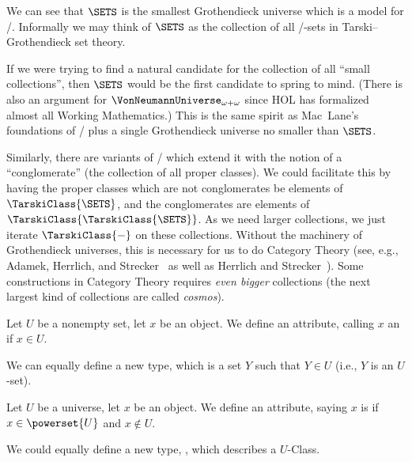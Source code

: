 \begin{remark}
We can see that $\SETS$ is the smallest Grothendieck universe which is a
model for \ZFC/. Informally we may think of $\SETS$ as the collection
of all \ZF/-sets in Tarski--Grothendieck set theory.

If we were trying to find a natural candidate for the collection of
all ``small collections'', then $\SETS$ would be the first candidate
to spring to mind. (There is also an argument for
$\VonNeumannUniverse_{\omega+\omega}$ since HOL has formalized almost
all Working Mathematics.) This is the same spirit as Mac~Lane's
foundations of \ZFpmC/ plus a single Grothendieck universe no smaller
than $\SETS$.

Similarly, there are variants of \MK/ which extend it with the notion
of a ``conglomerate'' (the collection of all proper classes). We could
facilitate this by having the proper classes which are not
conglomerates be elements of $\TarskiClass{\SETS}$, and the
conglomerates are elements of $\TarskiClass{\TarskiClass{\SETS}}$. As
we need larger collections, we just iterate $\TarskiClass{-}$ on these
collections. Without the machinery of Grothendieck universes, this is
necessary for us to do Category Theory (see, e.g., Adamek, Herrlich, and Strecker~\cite{adamek1990abstract}
as well as Herrlich and Strecker~\cite{horst2007category}). Some
constructions in Category Theory requires \emph{even bigger}
collections (the next largest kind of collections are called
\emph{cosmos}). 
\end{remark}

\begin{definition}[$U$-sets]
Let $U$ be a nonempty set, let $x$ be an object. We define an
attribute, calling $x$ an  if $x\in U$.

We can equally define a new type,  which is a set $Y$
such that $Y\in U$ (i.e., $Y$ is an $U$-set).
\end{definition}

\begin{definition}[$U$-classes]
Let $U$ be a universe, let $x$ be an object. We define an attribute,
saying $x$ is  if $x\in\powerset{U}$ and $x\notin U$.

We could equally define a new type, , which
describes a $U$-Class.
\end{definition}

